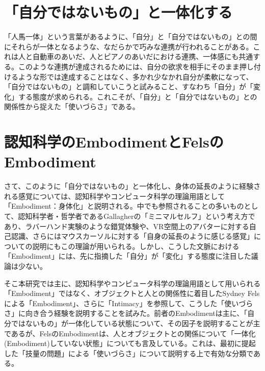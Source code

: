 \section*{「自分ではないもの」と一体化する}
「人馬一体」という言葉があるように、「自分」と「自分ではないもの」との間にそれらが一体となるような、なだらかで巧みな連携が行われることがある。これは人と自動車のあいだ、人とピアノのあいだにおける連携、一体感にも共通する。このような連携が達成されるためには、自分の欲求を相手にそのまま押し付けるような形では達成することはなく、多かれ少なかれ自分が柔軟になって、「自分ではないもの」と調和していこうと試みること、すなわち「自分」が「変化」する態度が求められる。これこそが、「自分」と「自分ではないもの」との関係性から捉えた「使いづらさ」である。

\section*{認知科学のEmbodimentとFelsのEmbodiment}
さて、このように「自分ではないもの」と一体化し、身体の延長のように経験される感覚については、認知科学やコンピュータ科学の理論用語として「Embodiment：身体化」と説明される。中でも参照されることの多いものとして、認知科学者・哲学者であるGallagher\cite{Gallagher2000}の「ミニマルセルフ」という考え方であり、ラバーハンド実験のような錯覚体験や、VR空間上のアバターに対する自己認識、さらにはマウスカーソルに対する「自身の延長のように感じる感覚」についての説明\cite{Watanabe2013}にもこの理論が用いられる。しかし、こうした文脈における「Embodiment」には、先に指摘した「自分」が「変化」する態度に注目した議論は少ない。

そこ本研究では主に、認知科学やコンピュータ科学の理論用語として用いられる「Embodiment」ではなく、オブジェクトと人との関係性に着目したSydney Felsによる「Embodiment」、さらに「Intimacy」を参照して、こうした「使いづらさ」に向き合う経験を説明することを試みた。前者のEmbodimentは主に、「自分ではないもの」が一体化している状態について、その因子を説明することが主であるが、FelsのEmbodimentは、人とオブジェクトとの関係について「一体化(Embodiment)していない状態」についても言及している。これは、最初に提起した「技量の問題」による「使いづらさ」について説明する上で有効な分類である。

